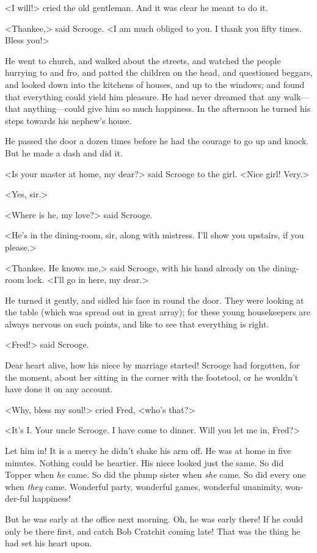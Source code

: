 <I will!> cried the old gentleman. And it was clear he meant to do it.

<Thankee,> said Scrooge. <I am much obliged to you. I thank you fifty times. Bless you!>

He went to church, and walked about the streets, and watched the people hurrying to and fro, and patted the children on the head, and questioned beggars, and looked down into the kitchens of houses, and up to the windows; and found that everything could yield him pleasure. He had never dreamed that any walk—that anything—could give him so much happiness. In the afternoon he turned his steps towards his nephew's house.

He passed the door a dozen times before he had the courage to go up and knock. But he made a dash and did it.

<Is your master at home, my dear?> said Scrooge to the girl. <Nice girl! Very.>

<Yes, sir.>

<Where is he, my love?> said Scrooge.

<He's in the dining-room, sir, along with mistress. I'll show you upstairs, if you please.>

<Thankee. He knows me,> said Scrooge, with his hand already on the dining-room lock. <I'll go in here, my dear.>

He turned it gently, and sidled his face in round the door. They were looking at the table (which was spread out in great array); for these young housekeepers are always nervous on such points, and like to see that everything is right.

<Fred!> said Scrooge.

Dear heart alive, how his niece by marriage started! Scrooge had forgotten, for the moment, about her sitting in the corner with the footstool, or he wouldn't have done it on any account.

<Why, bless my soul!> cried Fred, <who's that?>

<It's I\@. Your uncle Scrooge. I have come to dinner. Will you let me in, Fred?>

Let him in! It is a mercy he didn't shake his arm off. He was at home in five minutes. Nothing could be heartier. His niece looked just the same. So did Topper when \textit{he} came. So did the plump sister when \textit{she} came. So did every one when \textit{they} came. Wonderful party, wonderful games, wonderful unanimity, won-der-ful happiness!

But he was early at the office next morning. Oh, he was early there! If he could only be there first, and catch Bob Cratchit coming late! That was the thing he had set his heart upon.

